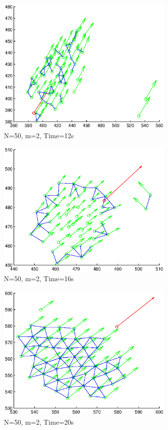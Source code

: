 \documentclass[10pt, conference]{IEEEtran}
\begin{document}
\begin{figure}[!p]
  \begin{center}
    \includegraphics[width=3.45in]{n50m2t12}
  \end{center}

  \caption{\small N=50, m=2, Time=12s}
  \label{fig:n50m2t12}
\end{figure}

\begin{figure}[!p]
  \begin{center}
    \includegraphics[width=3.45in]{n50m2t16}
  \end{center}

  \caption{\small N=50, m=2, Time=16s}
  \label{fig:n50m2t16}
\end{figure}

\begin{figure}[!p]
  \begin{center}
    \includegraphics[width=3.45in]{n50m2t20}
  \end{center}

  \caption{\small N=50, m=2, Time=20s}
  \label{fig:n50m2t20}
\end{figure}
\end{document}
